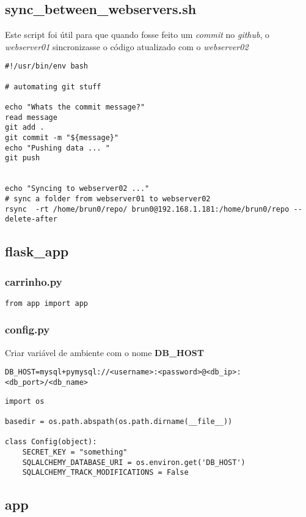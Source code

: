 \documentclass{report}
\begin{document}
\subsection{sync\_between\_webservers.sh}
Este script foi útil para que quando fosse feito um \emph{commit} no \emph{github}, o \emph{webserver01} sincronizasse o código atualizado com o \emph{webserver02}
\begin{lstlisting}
#!/usr/bin/env bash

# automating git stuff

echo "Whats the commit message?"
read message
git add .
git commit -m "${message}"
echo "Pushing data ... "
git push


echo "Syncing to webserver02 ..."
# sync a folder from webserver01 to webserver02
rsync  -rt /home/brun0/repo/ brun0@192.168.1.181:/home/brun0/repo --delete-after
\end{lstlisting}


\subsection{flask\_app}

\subsubsection{carrinho.py}
\begin{lstlisting}
from app import app
\end{lstlisting}


\subsubsection{config.py}
Criar variável de ambiente com o nome \textbf{DB\_HOST}
\begin{lstlisting}
DB_HOST=mysql+pymysql://<username>:<password>@<db_ip>:<db_port>/<db_name>
\end{lstlisting}

\begin{lstlisting}
import os

basedir = os.path.abspath(os.path.dirname(__file__))

class Config(object):
	SECRET_KEY = "something"
	SQLALCHEMY_DATABASE_URI = os.environ.get('DB_HOST')
	SQLALCHEMY_TRACK_MODIFICATIONS = False

\end{lstlisting}

\subsection{app}
\end{document}
